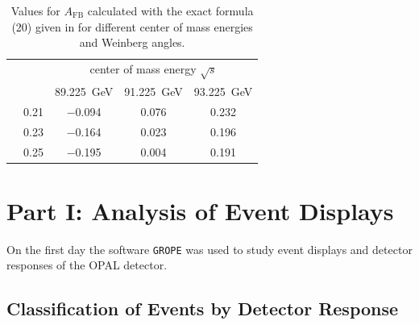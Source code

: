\documentclass[11pt, a4paper]{article}
\numberwithin{equation}{section}
\begin{document}
\begin{table}[h]
	\centering
	\begin{tabular}{cl|ccc}
	& 			& \multicolumn{3}{c}{center of mass energy $\sqrt{s}$} 		\\
	&			& \SI{89.225}{GeV} 	& \SI{91.225}{GeV} 	& \SI{93.225}{GeV} 	\\\hline
	\multirow{3}{*}{\rotatebox{90}{$\sin^2\theta_\mathrm{W}$}}
	& \num{0.21} 	& \num{-0.094} 		& \num{0.076}		& \num{0.232}		\\
	& \num{0.23} 	& \num{-0.164}		& \num{0.023}		& \num{0.196}		\\
	& \num{0.25}	& \num{-0.195}		& \num{0.004}		& \num{0.191} 		\\	
	\end{tabular}
	\caption{Values for $A_\mathrm{FB}$ calculated with the exact formula (20) given in \cite{instructions} for different center of mass energies and Weinberg angles.}
\end{table}





\section{Part I: Analysis of Event Displays}

On the first day the software \texttt{GROPE} was used to study event displays and detector responses of the OPAL detector.

\subsection{Classification of Events by Detector Response}
\end{document}
